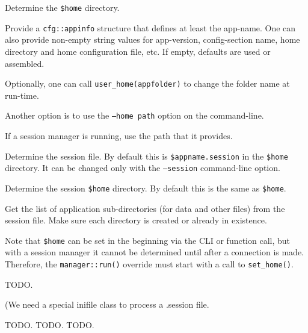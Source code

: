    \begin{enumber}
      \item Determine the \texttt{\$home} directory.
      \begin{enumber}
         \item Provide a \texttt{cfg::appinfo} structure
            that defines at least the app-name.  One can also provide
            non-empty string values for app-version, config-section name,
            home directory and home configuration file, etc. If empty,
            defaults are used or assembled.
         \item Optionally, one can call \texttt{user\_home(appfolder)}
            to change the folder name at run-time.
         \item Another option is to use the \texttt{--home path} option
            on the command-line.
         \item If a session manager is running, use the path that it
            provides.
      \end{enumber}
      \item Determine the session file.
         By default this is \texttt{\$appname.session} in the \texttt{\$home}
         directory. It can be changed only with the \texttt{--session}
         command-line option.
      \item Determine the session \texttt{\$home} directory.
         By default this is the same as \texttt{\$home}.
      \item Get the list of application sub-directories (for data and
         other files) from the session file.
         Make sure each directory is created or already in existence.
   \end{enumber}

   Note that \texttt{\$home} can be set in the beginning via the CLI or
   function call, but with a session manager it cannot be determined until
   after a connection is made.
   Therefore, the \texttt{manager::run()} override must start with a call to
   \texttt{set\_home()}.

   TODO.

   (We need a special inifile class to process a .session file.

   TODO.
   TODO.
   TODO.

